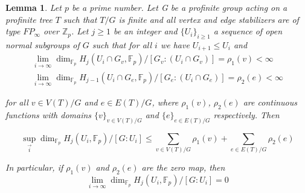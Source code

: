 \documentclass[10pt]{amsart}
\theoremstyle{plain}
\newtheorem{Lemma}[prop]{Lemma}
\theoremstyle{definition}
\theoremstyle{remark}
\numberwithin{prop}{section}
\numberwithin{example}{section}
\numberwithin{equation}{section}
\newcommand{\Z}{\mathbb{Z}}
\newcommand{\F}{\mathbb{F}}
\begin{document}
\begin{Lemma}\label{l20}
		Let $p$ be a prime number. Let G be a profinite group acting on a profinite tree
		$T$ such that $T/G$ is finite and all vertex and edge stabilizers are of type $FP_{\infty}$ over $\Z_p$.  Let  $j\geq 1$ be  an integer     and $\{U_i\}_{i\geq 1}$  a sequence of open  normal subgroups of $G$  such that for all $i$ we have $U_{i+1}\leq U_i$  and  
		\begin{eqnarray}
		\displaystyle\lim_{i\rightarrow\infty}\displaystyle\dim_{\F_p} H_j(U_i\cap G_v,\F_p)/[G_v:(U_i\cap G_v)]=\rho_1(v)<\infty\label{111}\\
		\displaystyle\lim_{i\rightarrow\infty}\displaystyle\dim_{\F_p} H_{j-1}(U_i\cap G_e,\F_p)/[G_e:(U_i\cap G_e)]=\rho_2(e)<\infty\label{2}
		\end{eqnarray}
		
		for all $v\in V(T)/G$ and $e\in E(T)/G$, where   
		$\rho_1(v)$, $\rho_2(e)$ are continuous functions with domains $\{v\}_{v\in V(T)/G}$ and $\{e\}_{e\in E(T)/G}$ respectively. Then 
		
		$$	\displaystyle\sup_{\overrightarrow{i}	}\displaystyle\dim_{\F_p} H_{j}(U_i,\F_p)/[G:U_i]\leq \displaystyle
		\sum_{v\in V(T)/G} \displaystyle\rho_1(v)+ \displaystyle
		\sum_{e\in E(T)/G} \displaystyle\rho_2(e)$$
		
		In particular, if  $\rho_1(v)$ and $\rho_2(e)$ are the zero map, then 
		$$	\displaystyle\lim_{i \rightarrow \infty
		}\displaystyle\dim_{\F_p} H_{j}(U_i,\F_p)/[G:U_i]=0$$
	\end{Lemma} 
	
\end{document}
